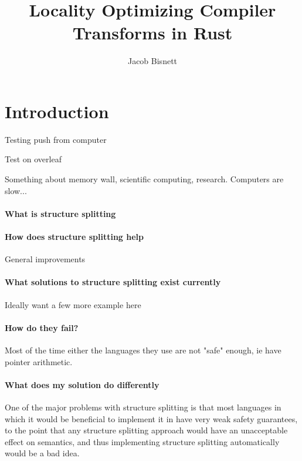 \documentclass[12pt,final]{article}
\begin{document}
\title{Locality Optimizing Compiler Transforms in Rust}
\author{Jacob Bisnett}
\maketitle

\section{Introduction}
\label{sec:intro}

Testing push from computer

Test on overleaf

Something about memory wall, scientific computing, research. Computers are slow...

\paragraph{What is structure splitting}

\paragraph{How does structure splitting help}
General improvements

\paragraph{What solutions to structure splitting exist currently}
Ideally want a few more example here

\paragraph{How do they fail?}
Most of the time either the languages they use are not "safe" enough, ie have pointer arithmetic. 

\paragraph{What does my solution do differently}

One of the major problems with
structure splitting is that most languages in which it would be beneficial to
implement it in have very weak safety guarantees, to the point that any
structure splitting approach would have an unacceptable effect on semantics, and
thus implementing structure splitting automatically would be a bad idea.
\end{document}
